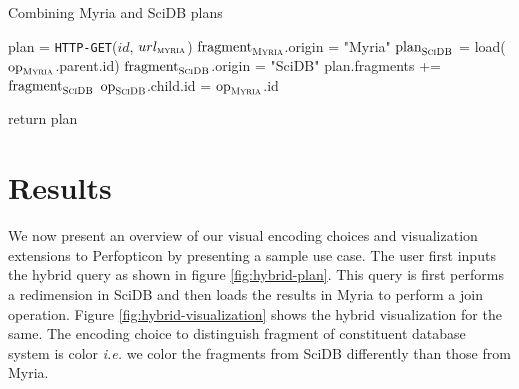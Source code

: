 \documentclass{chi2009}
\newcommand{\ie}{{\em i.e.} }
\begin{document}
\begin{algorithm}
\caption{Combining Myria and SciDB plans}\label{alg:create-hybrid-plan}
\begin{algorithmic}[1]
\State plan = \texttt{HTTP-GET}($id$, $url_{\textsc{myria}}$)
  \State $\text{fragment}_{\textsc{Myria}}$.origin = "Myria"
      \State $\text{plan}_{\textsc{SciDB}}$ = load($\text{op}_{\textsc{Myria}}$.parent.id)
		\State $\text{fragment}_{\textsc{SciDB}}$.origin = "SciDB"
        \State plan.fragments += $\text{fragment}_{\textsc{SciDB}}$
          	\State $\text{op}_{\textsc{SciDB}}$.child.id = $\text{op}_{\textsc{Myria}}$.id
          \EndIf
        \EndFor
	  \EndFor
    \EndIf
  \EndFor
\EndFor

\State return plan

\end{algorithmic}
\end{algorithm}

\section{Results}

We now present an overview of our visual encoding choices and visualization extensions to Perfopticon by presenting a sample use case. The user first inputs the hybrid query as shown in figure \ref{fig:hybrid-plan}. This query is first performs a redimension in SciDB and then loads the results in Myria to perform a join operation. Figure \ref{fig:hybrid-visualization} shows the hybrid visualization for the same. The encoding choice to distinguish fragment of constituent database system is color \ie we color the fragments from SciDB differently than those from Myria.
\end{document}
